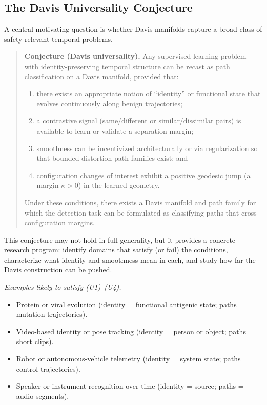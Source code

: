 \documentclass[11pt]{article}
\theoremstyle{remark}
\theoremstyle{plain}
\begin{document}
\subsection{The Davis Universality Conjecture}

A central motivating question is whether Davis manifolds capture a broad class of safety-relevant
temporal problems.

\begin{quote}
\textbf{Conjecture (Davis universality).}%
\quad
Any supervised learning problem with identity-preserving temporal structure can be recast as path
classification on a Davis manifold, provided that:
\begin{enumerate}[label=(U\arabic*), topsep=2pt,leftmargin=1.5em]
  \item there exists an appropriate notion of ``identity'' or functional state that evolves continuously
        along benign trajectories;
  \item a contrastive signal (same/different or similar/dissimilar pairs) is available to learn or validate
        a separation margin;
  \item smoothness can be incentivized architecturally or via regularization so that bounded-distortion
        path families exist; and
  \item configuration changes of interest exhibit a positive geodesic jump (a margin $\kappa > 0$)
        in the learned geometry.
\end{enumerate}
Under these conditions, there exists a Davis manifold and path family for which the detection task
can be formulated as classifying paths that cross configuration margins.
\end{quote}

This conjecture may not hold in full generality, but it provides a concrete research program: identify
domains that satisfy (or fail) the conditions, characterize what identity and smoothness mean in
each, and study how far the Davis construction can be pushed.

\medskip\noindent
\emph{Examples likely to satisfy (U1)--(U4).}
\begin{itemize}[leftmargin=1.6em,itemsep=2pt,topsep=2pt]
  \item Protein or viral evolution (identity = functional antigenic state; paths = mutation trajectories).
  \item Video-based identity or pose tracking (identity = person or object; paths = short clips).
  \item Robot or autonomous-vehicle telemetry (identity = system state; paths = control trajectories).
  \item Speaker or instrument recognition over time (identity = source; paths = audio segments).
\end{itemize}
\end{document}
